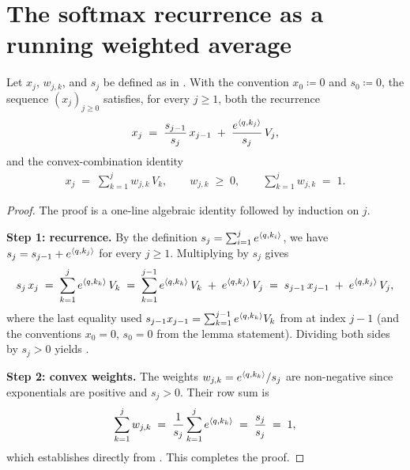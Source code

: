 \section{The softmax recurrence as a running weighted average}
\label{sec:softmax_running_average}

\begin{lemma}\label{lem:softmax_running_average}
Let $x_j$, $w_{j,k}$, and $s_j$ be defined as in
. With the convention $x_0 \coloneqq 0$ and
$s_0 \coloneqq 0$, the sequence $(x_j)_{j\ge 0}$ satisfies, for every
$j \ge 1$, both the recurrence
\begin{align}\label{eq:recurrence}
   x_j \;=\; \frac{s_{j-1}}{s_j}\, x_{j-1} \;+\; \frac{e^{\left\langle q, k_j \right\rangle}}{s_j}\, V_j,
\end{align}
and the convex-combination identity
\begin{align}\label{eq:running_average}
   x_j \;=\; \sum_{k=1}^{j} w_{j,k}\, V_k,
   \qquad
   w_{j,k} \;\ge\; 0,
   \qquad
   \sum_{k=1}^{j} w_{j,k} \;=\; 1.
\end{align}
\end{lemma}

\begin{proof}
The proof is a one-line algebraic identity followed by induction on $j$.

\noindent\textbf{Step 1: recurrence.}
By the definition $s_j = \sum_{i=1}^{j} e^{\left\langle q, k_i \right\rangle}$, we have
$s_j = s_{j-1} + e^{\left\langle q, k_j \right\rangle}$ for every $j \ge 1$. Multiplying
 by $s_j$ gives
\begin{align*}
   s_j\, x_j
   \;=\; \sum_{k=1}^{j} e^{\left\langle q, k_k \right\rangle}\, V_k
   \;=\; \sum_{k=1}^{j-1} e^{\left\langle q, k_k \right\rangle}\, V_k \;+\; e^{\left\langle q, k_j \right\rangle}\, V_j
   \;=\; s_{j-1}\, x_{j-1} \;+\; e^{\left\langle q, k_j \right\rangle}\, V_j,
\end{align*}
where the last equality used $s_{j-1} x_{j-1} = \sum_{k=1}^{j-1} e^{\left\langle q, k_k \right\rangle} V_k$
from  at index $j-1$ (and the conventions
$x_0 = 0$, $s_0 = 0$ from the lemma statement). Dividing both sides by
$s_j > 0$ yields .

\noindent\textbf{Step 2: convex weights.}
The weights $w_{j,k} = e^{\left\langle q, k_k \right\rangle}/s_j$ are non-negative since
exponentials are positive and $s_j > 0$. Their row sum is
\begin{align*}
   \sum_{k=1}^{j} w_{j,k}
   \;=\; \frac{1}{s_j} \sum_{k=1}^{j} e^{\left\langle q, k_k \right\rangle}
   \;=\; \frac{s_j}{s_j}
   \;=\; 1,
\end{align*}
which establishes  directly from
. This completes the proof.
\end{proof}
